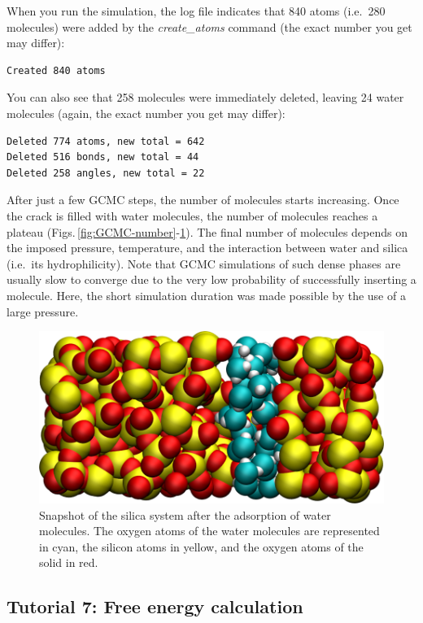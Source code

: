 \documentclass[9pt,tutorial]{livecoms}
\begin{document}
When you run the simulation, the log file indicates that 840 atoms (i.e.~280 molecules)
were added by the \textit{create\_atoms} command (the exact number you get may differ):
{\normalsize \begin{verbatim}
Created 840 atoms
\end{verbatim}}
You can also see that 258 molecules were immediately deleted, leaving 24 water
molecules (again, the exact number you get may differ):
{\normalsize \begin{verbatim}
Deleted 774 atoms, new total = 642
Deleted 516 bonds, new total = 44
Deleted 258 angles, new total = 22
\end{verbatim}}
After just a few GCMC steps, the number of molecules starts increasing. Once the
crack is filled with water molecules, the number of molecules reaches a plateau
(Figs.\,\ref{fig:GCMC-number}-\ref{fig:GCMC-solvated}). The final number of
molecules depends on the imposed pressure, temperature, and the interaction
between water and silica (i.e.~its hydrophilicity). Note that GCMC simulations
of such dense phases are usually slow to converge due to the very low probability
of successfully inserting a molecule. Here, the short simulation duration was
made possible by the use of a large pressure.

\begin{figure}
\centering
\includegraphics[width=\linewidth]{GCMC-solvated}
\caption{Snapshot of the silica system after the adsorption of water molecules.
The oxygen atoms of the water molecules are represented in cyan, the silicon
atoms in yellow, and the oxygen atoms of the solid in red.}
\label{fig:GCMC-solvated}
\end{figure}

\subsection{Tutorial 7: Free energy calculation}
\label{umbrella-sampling-label}
\end{document}
